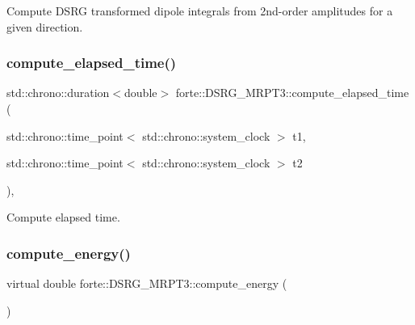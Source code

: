 Compute D\+S\+RG transformed dipole integrals from 2nd-\/order amplitudes for a given direction. 

\mbox{\label{classforte_1_1_d_s_r_g___m_r_p_t3_ac2e41cad2c6f82f0b7051b02becd1595}} 
\subsubsection{\texorpdfstring{compute\+\_\+elapsed\+\_\+time()}{compute\_elapsed\_time()}}
{\footnotesize\ttfamily std\+::chrono\+::duration$<$double$>$ forte\+::\+D\+S\+R\+G\+\_\+\+M\+R\+P\+T3\+::compute\+\_\+elapsed\+\_\+time (\begin{DoxyParamCaption}\item[{std\+::chrono\+::time\+\_\+point$<$ std\+::chrono\+::system\+\_\+clock $>$}]{t1,  }\item[{std\+::chrono\+::time\+\_\+point$<$ std\+::chrono\+::system\+\_\+clock $>$}]{t2 }\end{DoxyParamCaption})\hspace{0.3cm}{\ttfamily [inline]}, {\ttfamily [protected]}}



Compute elapsed time. 

\mbox{\label{classforte_1_1_d_s_r_g___m_r_p_t3_a48a25a952206690bcf8125e583576052}} 
\subsubsection{\texorpdfstring{compute\+\_\+energy()}{compute\_energy()}}
{\footnotesize\ttfamily virtual double forte\+::\+D\+S\+R\+G\+\_\+\+M\+R\+P\+T3\+::compute\+\_\+energy (\begin{DoxyParamCaption}{ }\end{DoxyParamCaption})\hspace{0.3cm}{\ttfamily [virtual]}}



